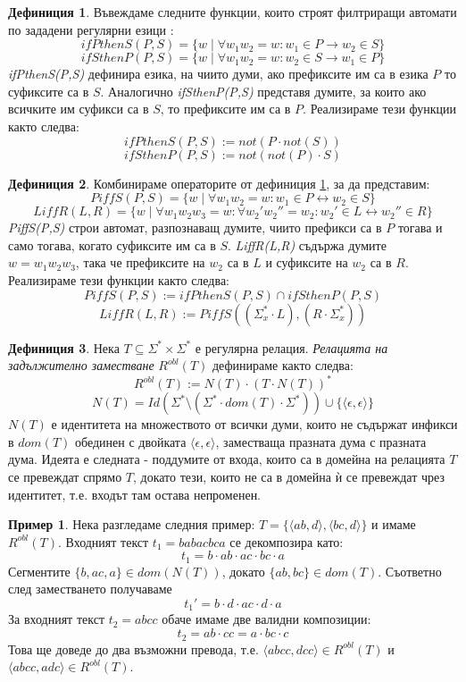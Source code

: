 \documentclass[12pt, oneside]{article}
\theoremstyle{definition}
\newtheorem{definition}{Дефиниция}[section]
\newtheorem{example}{Пример}[section]
\begin{document}
\begin{definition}\label{def:defIfPThenS}
	Въвеждаме следните функции, които строят филтриращи автомати по зададени регулярни езици \cite{Kaplan&Kay:94}:
	\[ ifPthenS(P,S) = \{ w \mid \forall w_1w_2 = w: w_1 \in P \to w_2 \in S \} \]
	\[ ifSthenP(P,S) = \{ w \mid \forall w_1w_2 = w: w_2 \in S \to w_1 \in P \} \]
	\emph{ifPthenS(P,S)} дефинира езика, на чиито думи, ако префиксите им са в езика \(P\) то суфиксите са в \(S\). Аналогично \emph{ifSthenP(P,S)} представя думите, за които ако всичките им суфикси са в \(S\), то префиксите им са в \(P\). Реализираме тези функции както следва:
	\[ ifPthenS(P,S) := not(P \cdot not(S)) \]
	\[ ifSthenP(P,S) := not(not(P) \cdot S) \]	
\end{definition}

\begin{definition}
	Комбинираме операторите от дефиниция \ref{def:defIfPThenS}, за да представим:
	\[ PiffS(P,S) = \{ w \mid \forall w_1w_2 = w: w_1 \in P \leftrightarrow w_2 \in S \} \]
	\[ LiffR(L,R) = \{ w \mid \forall w_1w_2w_3 = w: \forall w_2'w_2'' = w_2: w_2' \in L \leftrightarrow w_2'' \in R \} \]
	\emph{PiffS(P,S)} строи автомат, разпознаващ думите, чиито префикси са в \(P\) тогава и само тогава, когато суфиксите им са в \(S\). \emph{LiffR(L,R)} съдържа думите \( w = w_1w_2w_3 \), така че префиксите на \(w_2\) са в \(L\) и суфиксите на \(w_2\) са в \(R\). Реализираме тези функции както следва:
	\[ PiffS(P,S) := ifPthenS(P,S) \cap ifSthenP(P,S) \]
	\[ LiffR(L,R) := PiffS((\Sigma_x^* \cdot L), (R \cdot \Sigma_x^*)) \]	
\end{definition}

\begin{definition}\label{def:Robl}
	Нека \(T \subseteq \Sigma^* \times \Sigma^* \) е регулярна релация. \emph{Релацията на задължително заместване} \(R^{obl}(T)\) дефинираме както следва:
	\[ R^{obl}(T) := N(T) \cdot (T \cdot N(T))^* \]
	\[ N(T) = Id(\Sigma^* \setminus (\Sigma^* \cdot dom(T) \cdot \Sigma^*)) \cup \{ \langle \epsilon, \epsilon \rangle \} \]
	\(N(T)\) е идентитета на множеството от всички думи, които не съдържат инфикси в \(dom(T)\) обединен с двойката \(\langle \epsilon, \epsilon \rangle\), заместваща празната дума с празната дума.
	Идеята е следната - поддумите от входа, които са в домейна на релацията \(T\) се превеждат спрямо \(T\), докато тези, които не са в домейна ѝ се превеждат чрез идентитет, т.е. входът там остава непроменен.
\end{definition}

\begin{example}
	Нека разгледаме следния пример: \(T = \{ \langle ab, d \rangle, \langle bc, d \rangle \} \) и имаме \(R^{obl}(T) \). Входният текст \( t_1 = babacbca \) се декомпозира като:
	\[ t_1 = b \cdot ab \cdot ac \cdot bc \cdot a \]
	Сегментите \(\{b, ac, a\} \in dom(N(T))\), докато \(\{ab, bc\} \in dom(T)\). Съответно след заместването получаваме
	\[ t_1' = b \cdot d \cdot ac \cdot d \cdot a \]
	За входният текст \( t_2 = abcc \) обаче имаме две валидни композиции:
	\[ t_2 = ab \cdot cc = a \cdot bc \cdot c \]
	Това ще доведе до два възможни превода, т.е. \( \langle abcc, dcc \rangle \in R^{obl}(T) \) и \( \langle abcc, adc \rangle \in R^{obl}(T) \).
\end{example}
\end{document}
